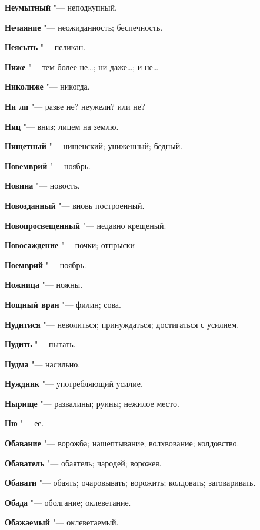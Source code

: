 \begin{mymulticols}
\noindent\textbf{Неумытный} "--- неподкупный. 

\noindent\textbf{Нечаяние} "--- неожиданность; беспечность. 

\noindent\textbf{Неясыть} "--- пеликан. 

\noindent\textbf{Ниже} "--- тем более не…; ни даже…; и не… 

\noindent\textbf{Николиже} "--- никогда. 

\noindent\textbf{Ни ли} "--- разве не? неужели? или не? 

\noindent\textbf{Ниц} "--- вниз; лицем на землю. 

\noindent\textbf{Нищетный} "--- нищенский; униженный; бедный. 

\noindent\textbf{Новемврий} "--- ноябрь. 

\noindent\textbf{Новина} "--- новость. 

\noindent\textbf{Новозданный} "--- вновь построенный. 

\noindent\textbf{Новопросвещенный} "--- недавно крещеный. 

\noindent\textbf{Новосаждение} "--- почки; отпрыски 

\noindent\textbf{Ноемврий} "--- ноябрь. 

\noindent\textbf{Ножница} "--- ножны. 

\noindent\textbf{Нощный вран} "--- филин; сова. 

\noindent\textbf{Нудитися} "--- неволиться; принуждаться; достигаться с усилием. 

\noindent\textbf{Нудить} "--- пытать. 

\noindent\textbf{Нудма} "--- насильно. 

\noindent\textbf{Нуждник} "--- употребляющий усилие. 

\noindent\textbf{Нырище} "--- развалины; руины; нежилое место. 

\noindent\textbf{Ню} "--- ее. 

\bukvaending


\noindent\textbf{Обавание} "--- ворожба; нашептывание; волхвование; колдовство. 

\noindent\textbf{Обаватель} "--- обаятель; чародей; ворожея. 

\noindent\textbf{Обавати} "--- обаять; очаровывать; ворожить; колдовать; заговаривать. 

\noindent\textbf{Обада} "--- оболгание; оклеветание. 

\noindent\textbf{Обажаемый} "--- оклеветаемый. 


\end{mymulticols}
